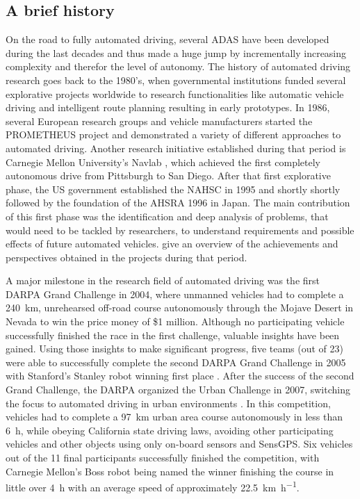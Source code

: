 \subsection{A brief history}
\label{subsec:aut_driving_hist}

On the road to fully automated driving, several \ac{ADAS} have been developed during the last decades and thus made a huge jump by incrementally increasing complexity and therefor the level of autonomy.
The history of automated driving research goes back to the 1980's, when governmental institutions funded several explorative projects worldwide to research functionalities like automatic vehicle driving and intelligent route planning resulting in early prototypes.
In 1986, several European research groups and vehicle manufacturers started the \ac{PROMETHEUS} project \parencite{Dickmanns1990} and demonstrated a variety of different approaches to automated driving.
Another research initiative established during that period is Carnegie Mellon University's Navlab \parencite{Thorpe1988}, which achieved the first completely autonomous drive from Pittsburgh to San Diego.
After that first explorative phase, the US government established the \ac{NAHSC} in 1995 and shortly shortly followed by the foundation of the \ac{AHSRA} 1996 in Japan.
The main contribution of this first phase was the identification and deep analysis of problems, that would need to be tackled by researchers, to understand requirements and possible effects of future automated vehicles.
\textcite{Bertozzi2000} give an overview of the achievements and perspectives obtained in the projects during that period.

A major milestone in the research field of automated driving was the first \ac{DARPA} Grand Challenge in 2004, where unmanned vehicles had to complete a \SI{240}{\kilo\meter}, unrehearsed off-road course autonomously through the Mojave Desert in Nevada to win the price money of \$1 million.
Although no participating vehicle successfully finished the race \parencite{Bacha2004} in the first challenge, valuable insights have been gained.
Using those insights to make significant progress, five teams (out of 23) were able to successfully complete the second \ac{DARPA} Grand Challenge in \num{2005} with Stanford's Stanley robot winning first place \parencite{Thrun2006}.
After the success of the second Grand Challenge, the \ac{DARPA} organized the Urban Challenge in \num{2007}, switching the focus to automated driving in urban environments \parencite{Buehler2009}.
In this competition, vehicles had to complete a \SI{97}{\kilo\meter} urban area course autonomously in less than \SI{6}{\hour}, while obeying California state driving laws, avoiding other participating vehicles and other objects using only on-board sensors and \ac{SensGPS}.
Six vehicles out of the 11 final participants successfully finished the competition, with Carnegie Mellon's Boss robot \parencite{Urmson.2008} being named the winner finishing the course in little over \SI{4}{\hour} with an average speed of approximately \SI[per-mode=symbol]{22.5}{\kilo\meter\per\hour}.

